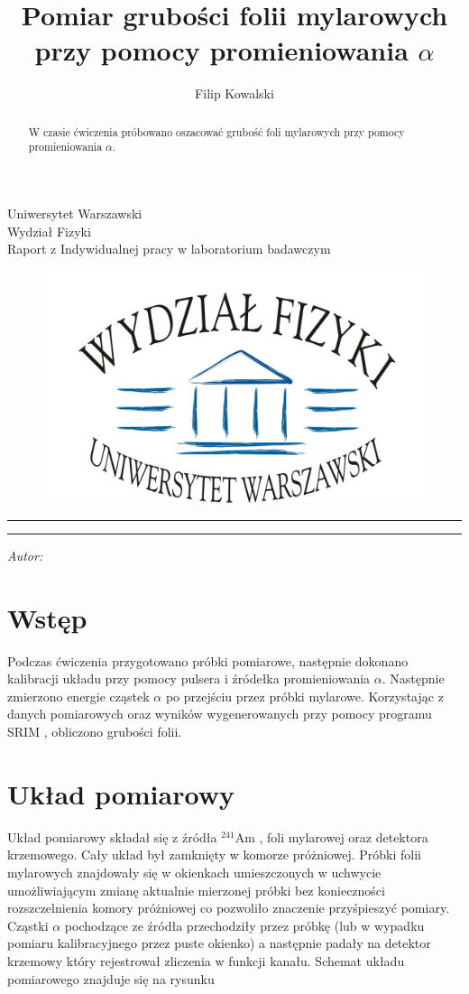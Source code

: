 \documentclass[12pt,a4paper]{article}
\author{Filip Kowalski }
\title{Pomiar grubości folii mylarowych przy pomocy promieniowania $\alpha$}
\makeatletter
\newcommand{\linia}{\rule{\linewidth}{0.4mm}}
\newcommand{\Ameryk}{${}^{241}_{}{}$Am }
\renewcommand{\maketitle}{\begin{titlepage}
    \vspace*{1cm}
    \begin{center}\small
    Uniwersytet Warszawski\\
    Wydział Fizyki\\
   Raport z Indywidualnej pracy w laboratorium badawczym
    \end{center}
    
\begin{figure}[h]
    \centering
    \includegraphics[scale=0.5]{logo.jpg}
    \end{figure}


    \vspace{3cm}
    \noindent\linia
    \begin{center}
      \LARGE \textsc{\@title}
         \end{center}
     \linia
    \vspace{0.5cm}
    \begin{flushright}
    \begin{minipage}{5cm}
    \textit{\small Autor:}\\
    \normalsize \textsc{\@author} \par
    \end{minipage}
    \vspace{5cm}
    
     \end{flushright}
    \vspace*{\stretch{6}}
    \begin{center}
    \@date
    \end{center}
         \end{titlepage}}
\makeatother
\begin{document}
\maketitle
\begin{abstract}
W czasie ćwiczenia próbowano oszacować grubość foli mylarowych przy pomocy promieniowania $\alpha$. 
\end{abstract}
\section{Wstęp}
Podczas ćwiczenia przygotowano próbki pomiarowe, następnie dokonano kalibracji układu przy pomocy pulsera i źródełka promieniowania $\alpha$. Następnie zmierzono energie cząstek $\alpha$ po przejściu przez próbki mylarowe. Korzystając z danych pomiarowych oraz wyników wygenerowanych przy pomocy programu SRIM \cite{srim}, obliczono grubości folii.

\section{Układ pomiarowy}
Układ pomiarowy składał się z źródła \Ameryk, foli mylarowej oraz detektora krzemowego. Cały układ był zamknięty w komorze próżniowej. Próbki folii mylarowych znajdowały się w okienkach umieszczonych w uchwycie umożliwiającym zmianę aktualnie mierzonej próbki bez konieczności rozszczelnienia komory próżniowej co pozwoliło znaczenie przyśpieszyć pomiary. 
Cząstki $\alpha$ pochodzące ze źródła przechodziły przez próbkę (lub w wypadku pomiaru kalibracyjnego przez puste okienko) a następnie padały na detektor krzemowy który rejestrował zliczenia w funkcji kanału. Schemat układu pomiarowego znajduje się na rysunku 
\end{document}
